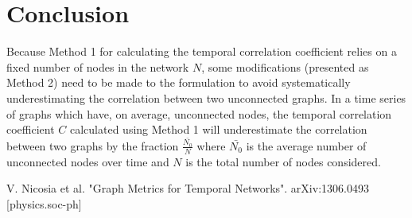 \documentclass[12pt]{article}
\begin{document}
\section{Conclusion}
Because Method 1 for calculating the temporal correlation coefficient relies on a fixed number of nodes in the network \(N\), some modifications (presented as Method 2) need to be made to the formulation to avoid systematically underestimating the correlation between two unconnected graphs. In a time series of graphs which have, on average, unconnected nodes, the temporal correlation coefficient \(C\) calculated using Method 1 will underestimate the correlation between two graphs by the fraction \(\frac{\bar{N_0}}{N}\) where \(\bar{N_0}\) is the average number of unconnected nodes over time and \(N\) is the total number of nodes considered.

\begin{thebibliography}{99}

 V. Nicosia et al. "Graph Metrics for Temporal Networks". \newline
arXiv:1306.0493 [physics.soc-ph]



\end{thebibliography}
\end{document}
